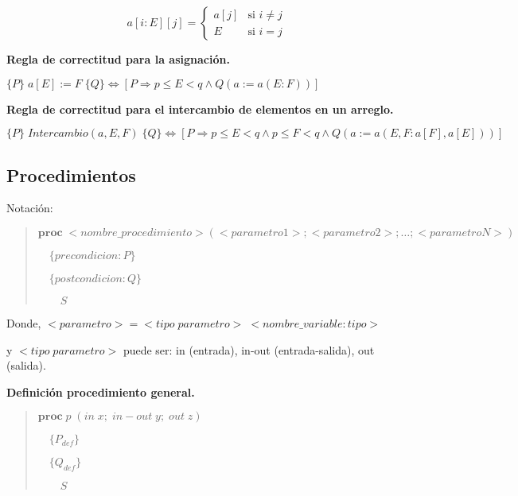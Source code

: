 \documentclass[hidelinks]{article}
\newenvironment{absolutelynopagebreak}
{\Needspace{10\baselineskip}\begin{quote}}
		{\end{quote}}
\begin{document}
\begin{equation}
	a[i: E][j] =
	\begin{cases}
		a[j] & \text{si } i \neq j \\
		E    & \text{si } i = j
	\end{cases}
\end{equation} \par

\textbf{Regla de correctitud para la asignación.}\par
$\{P\} \; a[E] := F \; \{Q\} \iff [P \Rightarrow p \leq E < q \land Q(a := a(E: F))]$\par

\textbf{Regla de correctitud para el intercambio de elementos en un arreglo.}\par
$\{P\} \; Intercambio(a,E,F) \; \{Q\} \iff [P \Rightarrow p \leq E < q \land p \leq F < q \land Q(a := a(E, F: a[F], a[E]))]$\par

\subsection{Procedimientos}\par
Notación:\par
\begin{absolutelynopagebreak}
	$\textbf{proc} \; <nombre\_procedimiento>(<parametro1>; <parametro2>; \dots; <parametroN>)$ \par
	$\quad \{precondicion: P\}$ \par
	$\quad \{postcondicion: Q\}$\par
	$\qquad S$\par
\end{absolutelynopagebreak}

Donde, $<parametro> = <tipo \; parametro> \; <nombre\_variable: tipo>$\par
y $<tipo \; parametro>$ puede ser: in (entrada), in-out (entrada-salida), out
(salida).\par

\vspace{2em}

\textbf{Definición procedimiento general.}\par

\begin{absolutelynopagebreak}
	$\textbf{proc} \; p \; (in \; x; \; in-out \; y; \; out \; z)$ \par
	$\quad \{P_{def}\}$ \par
	$\quad \{Q_{def}\}$\par
	$\qquad S$\par
\end{absolutelynopagebreak}
\end{document}
